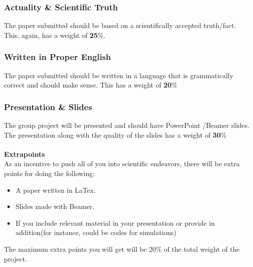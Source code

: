 \documentclass[9pt]{exam}
\begin{document}
	\subsubsection*{Actuality \& Scientific Truth}
	The paper submitted should be based on a scientifically accepted truth/fact. This, again, has a weight of \textbf{25}\%.
	\subsubsection*{Written in Proper English}
	The paper submitted should be written in a language that is grammatically correct and should make sense. This has a weight of \textbf{20}\%
	\subsubsection*{Presentation \& Slides}
	The group project will be presented and should have PowerPoint /Beamer slides. The presentation along with the quality of the slides has a weight of \textbf{30}\% \\ \\
	\textbf{Extrapoints}\\
	As an incentive to push all of you into scientific endeavors, there will be extra points for doing the following:
	\begin{itemize}
		\item A paper written in LaTex.
		\item Slides made with Beamer.
		\item If you include relevant material in your presentation or provide in addition(for instance, could be codes for simulations)
	\end{itemize}
	The maximum extra points you will get will be 20\% of the total weight of the project.
	
	
\end{document}
